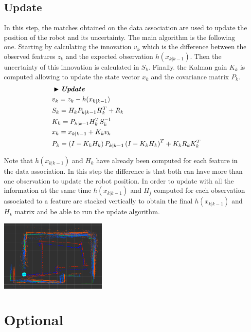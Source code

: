 \documentclass[a4paper,10pt]{article}
\begin{document}
\subsection{Update}

In this step, the matches obtained on the data association are used to update the position of the robot and its uncertainty. The main algorithm is the following one. Starting by calculating the innovation $v_k$ which is the difference between the observed features $z_k$ and the expected observation $h(x_{k|k-1})$. Then the uncertainty of this innovation is calculated in $S_k$. Finally. the Kalman gain $K_k$ is computed allowing to update the state vector $x_k$ and the covariance matrix $P_k$.
\begin{align*}
    & \blacktriangleright \textit{\textbf{Update}}\\
    & v_k = z_k - h(x_{k|k-1}) \\
    & S_k = H_k P_{k|k-1} H_k^T + R_k \\
    & K_k = P_{k|k-1}  H_k^T S_k^{-1} \\
    & x_k = x_{k|k-1} + K_k v_k \\      
    & P_k = \left( I - K_k H_{k} \right) P_{k|k-1} \left( I - K_k H_{k} \right)^T + K_k R_k K_k^T
\end{align*}

Note that $h(x_{k|k-1})$ and $H_k$ have already been computed for each feature in the data association. In this step the difference is that both can have more than one observation to update the robot position. In order to update with all the information at the same time $h(x_{k|k-1})$ and $H_j$ computed for each observation associated to a feature are stacked vertically to obtain the final $h(x_{k|k-1})$ and $H_k$ matrix and be able to run the update algorithm.

\begin{center}
	\includegraphics[width=0.40\textwidth]{pict/lab4_comp.png}
	\label{updates}
\end{center}

\section{Optional}
\end{document}
